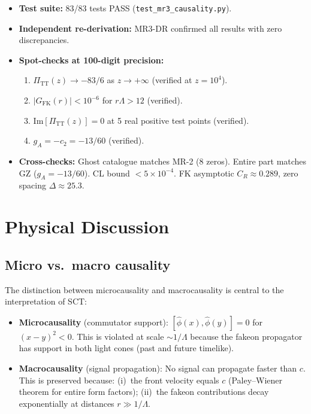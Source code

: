 \documentclass[11pt,a4paper]{article}
\newcommand{\PiTT}{\Pi_{\mathrm{TT}}}
\newcommand{\Imag}{\mathrm{Im}}
\newcommand{\Lam}{\Lambda}
\begin{document}
\begin{itemize}[nosep]
  \item \textbf{Test suite:} 83/83 tests PASS
    (\texttt{test\_mr3\_causality.py}).
  \item \textbf{Independent re-derivation:} MR3-DR confirmed all results with
    zero discrepancies.
  \item \textbf{Spot-checks at 100-digit precision:}
    \begin{enumerate}[nosep]
      \item $\PiTT(z) \to -83/6$ as $z \to +\infty$ (verified at $z = 10^4$).
      \item $|G_{\mathrm{FK}}(r)| < 10^{-6}$ for $r\Lam > 12$ (verified).
      \item $\Imag[\PiTT(z)] = 0$ at 5 real positive test points (verified).
      \item $g_A = -c_2 = -13/60$ (verified).
    \end{enumerate}
  \item \textbf{Cross-checks:} Ghost catalogue matches MR-2 (8 zeros).
    Entire part matches GZ ($g_A = -13/60$). CL bound $< 5\times10^{-4}$.
    FK asymptotic $C_R \approx 0.289$, zero spacing $\Delta \approx 25.3$.
\end{itemize}

\section{Physical Discussion}
\label{sec:discussion}

\subsection{Micro vs.\ macro causality}

The distinction between microcausality and macrocausality is central to the
interpretation of SCT:
\begin{itemize}
  \item \textbf{Microcausality} (commutator support):
    $[\hat{\phi}(x),\hat{\phi}(y)] = 0$ for $(x-y)^2 < 0$. This is violated
    at scale $\sim 1/\Lam$ because the fakeon propagator has support in both
    light cones (past and future timelike).
  \item \textbf{Macrocausality} (signal propagation):
    No signal can propagate faster than $c$. This is preserved because:
    (i)~the front velocity equals $c$ (Paley--Wiener theorem for entire form
    factors); (ii)~the fakeon contributions decay exponentially at distances
    $r \gg 1/\Lam$.
\end{itemize}
\end{document}

